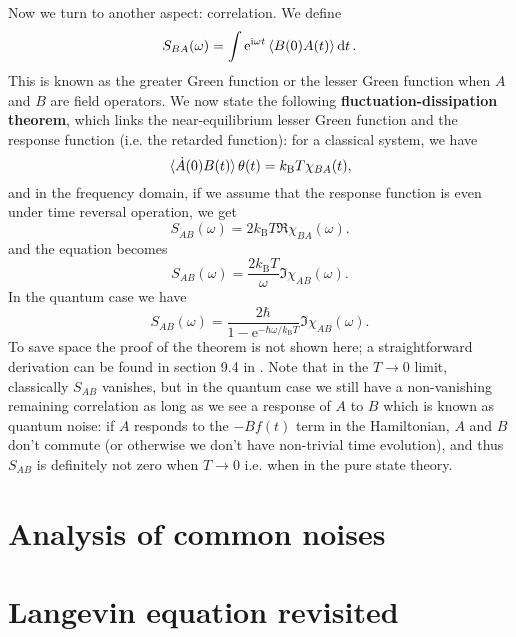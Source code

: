 \documentclass[hyperref, a4paper]{article}
\newcommand*{\ii}{\mathrm{i}}
\newcommand*{\ee}{\mathrm{e}}
\newcommand*{\concept}[1]{{\textbf{#1}}}
\newcommand*{\kB}{k_{\text{B}}}
\begin{document}
Now we turn to another aspect: correlation.
We define 
\begin{equation}
    S_{BA}(\omega) = \int \ee^{\ii \omega t} \expval{B(0) A(t)} \dd{t}.
\end{equation}
This is known as the greater Green function or the lesser Green function 
when $A$ and $B$ are field operators.
We now state the following \concept{fluctuation-dissipation theorem},
which links the near-equilibrium lesser Green function 
and the response function (i.e. the retarded function):
for a classical system, we have 
\begin{equation}
    \expval*{\dot{A}(0) B(t)} \theta(t) = \kB T \chi_{BA}(t),
\end{equation}
and in the frequency domain, 
if we assume that the response function 
is even under time reversal operation, we get 
\begin{equation}
    S_{\dot{A} B} (\omega) = 2 \kB T \Re \chi_{BA}(\omega).
\end{equation}
and the equation becomes 
\begin{equation}
    S_{AB}(\omega) = \frac{2 \kB T}{\omega} \Im \chi_{AB}(\omega).
\end{equation}
In the quantum case we have 
\begin{equation}
    S_{AB}(\omega) = \frac{2\hbar}{1 - \ee^{- \hbar \omega / \kB T}} \Im \chi_{AB}(\omega).
\end{equation}
To save space the proof of the theorem is not shown here; 
a straightforward derivation can be found in section 9.4 in \cite{coleman2015introduction}.
Note that in the $T \to 0$ limit, 
classically $S_{AB}$ vanishes,
but in the quantum case we still have a non-vanishing remaining correlation
as long as we see a response of $A$ to $B$
which is known as quantum noise:
if $A$ responds to the $- B f(t)$ term in the Hamiltonian,
$A$ and $B$ don't commute (or otherwise we don't have non-trivial time evolution),
and thus $S_{AB}$ is definitely not zero when $T \to 0$
i.e. when in the pure state theory.

\section{Analysis of common noises}


\section{Langevin equation revisited}
\end{document}
